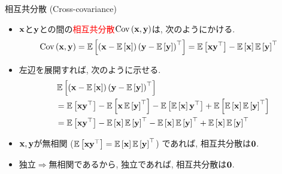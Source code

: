 \documentclass[dvipdfmx,notheorems,t]{beamer}
\begin{document}
\begin{frame}{相互共分散 (Cross-covariance)}
\begin{itemize}
  \item $\vb{x}$と$\vb{y}$との間の\textcolor{red}{相互共分散}$\Cov{\vb{x}}{\vb{y}}$は, 次のようにかける.
  \begin{align*}
    \Cov{\vb{x}}{\vb{y}}
      = \E{\left( \vb{x} - \E{\vb{x}} \right) \left( \vb{y} - \E{\vb{y}} \right)^\top}
      &= \E{\vb{x} \vb{y}^\top} - \E{\vb{x}} \E{\vb{y}}^\top
  \end{align*}
  \item 左辺を展開すれば, 次のように示せる.
  \begin{align*}
    & \E{\left( \vb{x} - \E{\vb{x}} \right) \left( \vb{y} - \E{\vb{y}} \right)^\top} \\
      &= \E{\vb{x} \vb{y}^\top} - \E{\vb{x} \E{\vb{y}}^\top}
        - \E{\E{\vb{x}} \vb{y}^\top} + \E{\E{\vb{x}} \E{\vb{y}}^\top} \\
      &= \E{\vb{x} \vb{y}^\top} - \E{\vb{x}} \E{\vb{y}}^\top
        - \E{\vb{x}} \E{\vb{y}}^\top + \E{\vb{x}} \E{\vb{y}}^\top
  \end{align*}
  \item $\vb{x}, \vb{y}$が無相関 ($\E{\vb{x} \vb{y}^\top} = \E{\vb{x}} \E{\vb{y}}^\top$) であれば, 相互共分散は$\vb{0}$.
  \item 独立$\Rightarrow$無相関であるから, 独立であれば, 相互共分散は$\vb{0}$.
\end{itemize}
\end{frame}
\end{document}
